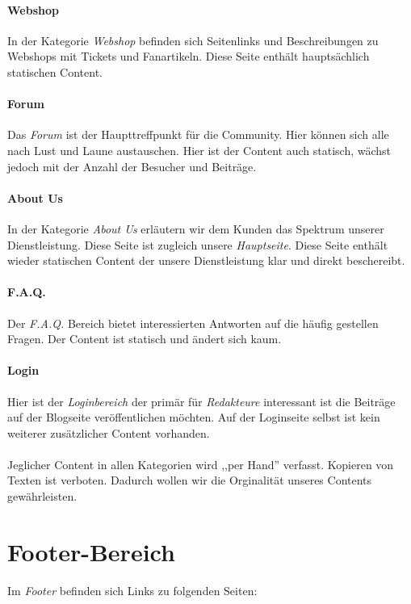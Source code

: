 \paragraph{Webshop}
In der Kategorie \emph{Webshop} befinden sich Seitenlinks und Beschreibungen zu
Webshops mit Tickets und Fanartikeln. Diese Seite enthält hauptsächlich
statischen Content.

\paragraph{Forum}
Das \emph{Forum} ist der Haupttreffpunkt für die Community. Hier können sich
alle nach Lust und Laune austauschen. Hier ist der Content auch statisch, wächst
jedoch mit der Anzahl der Besucher und Beiträge.

\paragraph{About Us}
In der Kategorie \emph{About Us} erläutern wir dem Kunden das Spektrum unserer
Dienstleistung. Diese Seite ist zugleich unsere \emph{Hauptseite}. Diese Seite
enthält wieder statischen Content der unsere Dienstleistung klar und direkt
beschereibt.

\paragraph{F.A.Q.}
Der \emph{F.A.Q.} Bereich bietet interessierten Antworten auf die häufig
gestellen Fragen. Der Content ist statisch und ändert sich kaum. 

\paragraph{Login}
Hier ist der \emph{Loginbereich} der primär für \emph{Redakteure} interessant
ist die Beiträge auf der Blogseite veröffentlichen möchten. Auf der Loginseite
selbst ist kein weiterer zusätzlicher Content vorhanden.
\\
\\
Jeglicher Content in allen Kategorien wird ,,per Hand'' verfasst. Kopieren von
Texten ist verboten. Dadurch wollen wir die Orginalität unseres Contents
gewährleisten.

\section{Footer-Bereich}
Im \emph{Footer} befinden sich Links zu folgenden Seiten:


